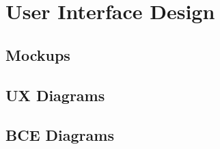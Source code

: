 %
%
\chapter{User Interface Design}
%
\label{cap:userinterfacedesign}
%
%
%
%
\section{Mockups}
%
%
%
%
\section{UX Diagrams}
%
%
%
%
\section{BCE Diagrams}
%
%
